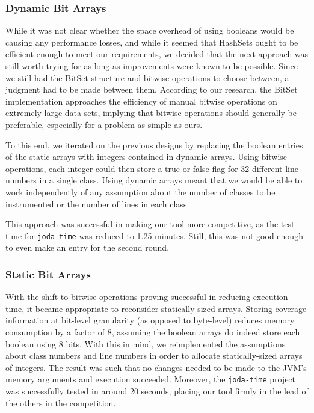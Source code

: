 \subsubsection{Dynamic Bit Arrays}

While it was not clear whether the space overhead of using booleans would be causing any performance losses, and while it seemed that HashSets ought to be efficient enough to meet our requirements, we decided that the next approach was still worth trying for as long as improvements were known to be possible. Since we still had the BitSet structure and bitwise operations to choose between, a judgment had to be made between them. According to our research, the BitSet implementation approaches the efficiency of manual bitwise operations on extremely large data sets, implying that bitwise operations should generally be preferable, especially for a problem as simple as ours.

To this end, we iterated on the previous designs by replacing the boolean entries of the static arrays with integers contained in dynamic arrays. Using bitwise operations, each integer could then store a true or false flag for 32 different line numbers in a single class. Using dynamic arrays meant that we would be able to work independently of any assumption about the number of classes to be instrumented or the number of lines in each class.

This approach was successful in making our tool more competitive, as the test time for \texttt{joda-time} was reduced to 1.25 minutes. Still, this was not good enough to even make an entry for the second round.

\subsubsection{Static Bit Arrays}

With the shift to bitwise operations proving successful in reducing execution time, it became appropriate to reconsider statically-sized arrays. Storing coverage information at bit-level granularity (as opposed to byte-level) reduces memory consumption by a factor of 8, assuming the boolean arrays do indeed store each boolean using 8 bits. With this in mind, we reimplemented the assumptions about class numbers and line numbers in order to allocate statically-sized arrays of integers. The result was such that no changes needed to be made to the JVM's memory arguments and execution succeeded. Moreover, the \texttt{joda-time} project was successfully tested in around 20 seconds, placing our tool firmly in the lead of the others in the competition.

